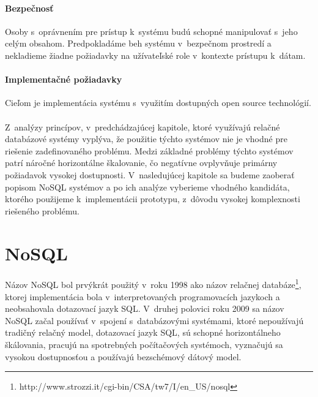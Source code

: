 \documentclass[11pt,twoside,a4paper]{book}
\begin{document}
\subsubsection*{Bezpečnosť}
Osoby s~oprávnením pre prístup k~systému budú schopné manipulovať s~jeho celým obsahom. Predpokladáme beh systému v~bezpečnom prostredí a nekladieme žiadne požiadavky na užívateľské role v~kontexte prístupu k~dátam.

\subsubsection*{Implementačné požiadavky}
Cieľom je implementácia systému s~využitím dostupných open source technológií. 

\subsubsection*{}
Z~analýzy princípov, v~predchádzajúcej kapitole, ktoré využívajú relačné databázové systémy vyplýva, že použitie týchto systémov nie je vhodné pre riešenie zadefinovaného problému. Medzi základné problémy týchto systémov patrí náročné horizontálne škalovanie, čo negatívne ovplyvňuje primárny požiadavok vysokej dostupnosti. V~nasledujúcej kapitole sa budeme zaoberať popisom NoSQL systémov a po ich analýze vyberieme vhodného kandidáta, ktorého použijeme k~implementácii prototypu, z~dôvodu vysokej komplexnosti riešeného problému.





\chapter{NoSQL}
\label{chapter:NoSQL}
Názov NoSQL bol prvýkrát použitý v~roku 1998 ako názov relačnej databáze\footnote{http://www.strozzi.it/cgi-bin/CSA/tw7/I/en\_US/nosql}, ktorej implementácia bola v~interpretovaných programovacích jazykoch a neobsahovala dotazovací jazyk SQL. V~druhej polovici roku 2009 sa názov NoSQL začal používať v~spojení s~databázovými systémami, ktoré nepoužívajú tradičný relačný model, dotazovací jazyk SQL, sú schopné horizontálneho škálovania, pracujú na spotrebných počítačových systémoch, vyznačujú sa vysokou dostupnosťou a používajú bezschémový dátový model.
\end{document}
